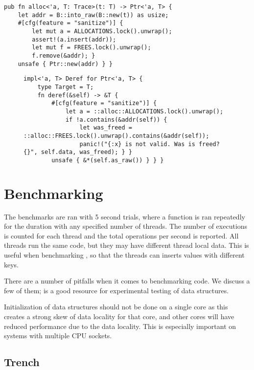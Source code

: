 \begin{lstlisting}[style=Rust]
pub fn alloc<'a, T: Trace>(t: T) -> Ptr<'a, T> {
    let addr = B::into_raw(B::new(t)) as usize;
    #[cfg(feature = "sanitize")] {
        let mut a = ALLOCATIONS.lock().unwrap();
        assert!(a.insert(addr));
        let mut f = FREES.lock().unwrap();
        f.remove(&addr); }
    unsafe { Ptr::new(addr) } } \end{lstlisting}

\begin{figure}[ht]
\begin{lstlisting}[style=Rust, label=lst:ptr-sanitize,caption=Verifying all pointer accesses with
\code{sanitize}]
impl<'a, T> Deref for Ptr<'a, T> {
    type Target = T;
    fn deref(&self) -> &T {
        #[cfg(feature = "sanitize")] {
            let a = ::alloc::ALLOCATIONS.lock().unwrap();
            if !a.contains(&addr(self)) {
                let was_freed = ::alloc::FREES.lock().unwrap().contains(&addr(self));
                panic!("{:x} is not valid. Was is freed? {}", self.data, was_freed); } }
        unsafe { &*(self.as_raw()) } } }\end{lstlisting}
\end{figure}

\section{Benchmarking}

The benchmarks are ran with 5 second trials, where a function is ran repeatedly for the duration
with any specified number of threads. The number of executions is counted for each thread and
the total operations per second is reported. All threads run the same code, but they may have
different thread local data. This is useful when benchmarking , so that the
threads can inserts values with different keys.

There are a number of pitfalls when it comes to benchmarking code. We discuss a few of them;
\cite{rare} is a good resource for experimental testing of data structures.

Initialization of data structures should not be done on a single core as this creates
a strong skew of data locality for that core, and other cores will have reduced performance due to
the data locality. This is especially important on systems with multiple CPU sockets.




\subsection{Trench}

